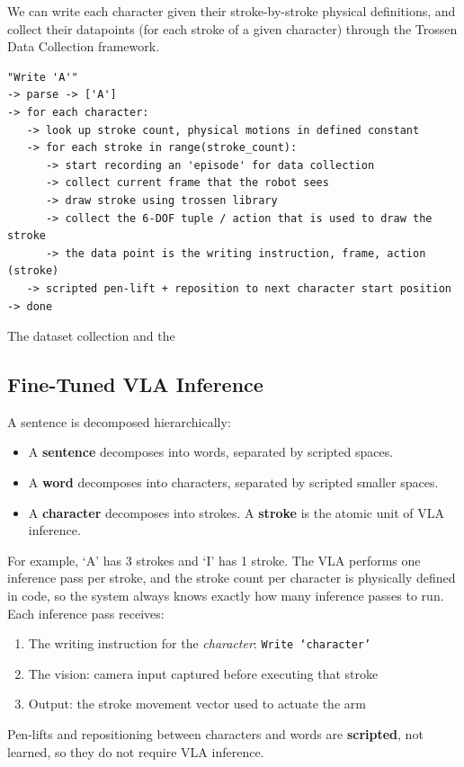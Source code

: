 \documentclass[12pt,a4paper]{article}
\begin{document}
We can write each character given their stroke-by-stroke physical definitions, and collect their datapoints (for each stroke of a given character) through the Trossen Data Collection framework.

\begin{verbatim}
"Write 'A'"
-> parse -> ['A']
-> for each character:
   -> look up stroke count, physical motions in defined constant
   -> for each stroke in range(stroke_count):
      -> start recording an 'episode' for data collection
      -> collect current frame that the robot sees
      -> draw stroke using trossen library
      -> collect the 6-DOF tuple / action that is used to draw the stroke
      -> the data point is the writing instruction, frame, action (stroke)
   -> scripted pen-lift + reposition to next character start position
-> done
\end{verbatim}

The dataset collection and the 

\subsection{Fine-Tuned VLA Inference}

A sentence is decomposed hierarchically:
\begin{itemize}
  \item A \textbf{sentence} decomposes into words, separated by scripted spaces.
  \item A \textbf{word} decomposes into characters, separated by scripted smaller spaces.
  \item A \textbf{character} decomposes into strokes. A \textbf{stroke} is the atomic unit of VLA inference.
\end{itemize}

For example, `A' has 3 strokes and `I' has 1 stroke. The VLA performs one inference pass per stroke, and the stroke count per character is physically defined in code, so the system always knows exactly how many inference passes to run. Each inference pass receives:
\begin{enumerate}
  \item The writing instruction for the \emph{character}: \texttt{Write `character'}
  \item The vision: camera input captured before executing that stroke
  \item Output: the stroke movement vector used to actuate the arm
\end{enumerate}

Pen-lifts and repositioning between characters and words are \textbf{scripted}, not learned, so they do not require VLA inference.
\end{document}
